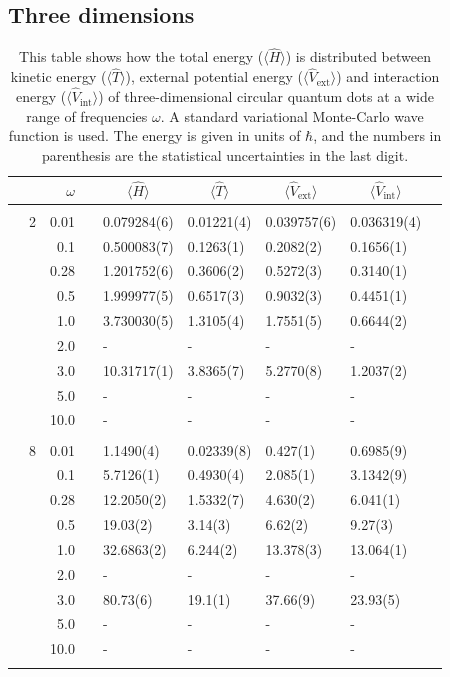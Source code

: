 \subsection{Three dimensions}
\begin{table}[H]
	\caption{This table shows how the total energy ($\langle\hat{H}\rangle$) is distributed between kinetic energy ($\langle\hat{T}\rangle$), external potential energy ($\langle\hat{V}_{\text{ext}}\rangle$) and interaction energy ($\langle\hat{V}_{\text{int}}\rangle$) of three-dimensional circular quantum dots at a wide range of frequencies $\omega$. A standard variational Monte-Carlo wave function is used. The energy is given in units of $\hbar$, and the numbers in parenthesis are the statistical uncertainties in the last digit.}
	\label{tab:splitfrequencyQDVMC3D}
	\begin{tabularx}{\textwidth}{R{1cm}rrcR{2.3cm}R{2.3cm}R{2.3cm}R{2.3cm}R{1cm}} \hline\hline
		&\makecell{\\ \phantom{$N$} \\ \phantom{=}} & $\omega$ &&  &  &  &  & \\ \hline \\
		&2 & 0.01 && 0.079284(6) & 0.01221(4) & 0.039757(6) & 0.036319(4) \\
		&& 0.1 && 0.500083(7) & 0.1263(1) & 0.2082(2) & 0.1656(1) \\
		&& 0.28 && 1.201752(6) & 0.3606(2) & 0.5272(3) & 0.3140(1) \\
		&& 0.5 && 1.999977(5) & 0.6517(3) & 0.9032(3) & 0.4451(1) \\
		&& 1.0 && 3.730030(5) & 1.3105(4) & 1.7551(5) & 0.6644(2) \\
		&& 2.0 && - & - & - & -\\
		&& 3.0 && 10.31717(1) & 3.8365(7) & 5.2770(8) & 1.2037(2) \\ 
		&& 5.0 && - & - & - & -\\
		&& 10.0 && - & - & - & -\\
		\hdashline \\
		
		&8 & 0.01 && 1.1490(4) & 0.02339(8) & 0.427(1) & 0.6985(9) \\
		&& 0.1 && 5.7126(1) & 0.4930(4) & 2.085(1) & 3.1342(9) \\
		&& 0.28 && 12.2050(2) & 1.5332(7) & 4.630(2) & 6.041(1) \\
		&& 0.5 && 19.03(2) & 3.14(3) & 6.62(2) & 9.27(3) \\
		&& 1.0 && 32.6863(2) & 6.244(2) & 13.378(3) & 13.064(1) \\
		&& 2.0 && - & - & - & -\\
		&& 3.0 && 80.73(6) & 19.1(1) & 37.66(9) & 23.93(5) \\ 
		&& 5.0 && - & - & - & -\\
		&& 10.0 && - & - & - & -\\
		\hdashline \\
		

\end{tabularx}
\end{table}
